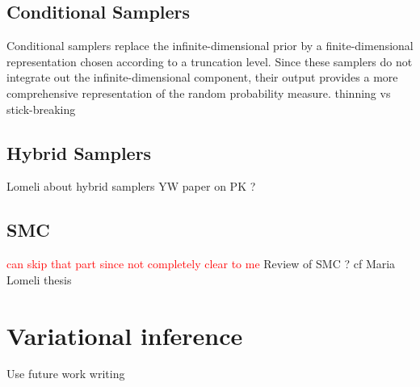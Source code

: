 \subsection{Conditional Samplers}
Conditional samplers replace the infinite-dimensional prior by a finite-dimensional representation chosen according to a truncation level. Since these samplers do not integrate out the infinite-dimensional component, their output provides a more comprehensive representation of the random probability measure.
thinning vs stick-breaking

\subsection{Hybrid Samplers}
Lomeli about hybrid samplers
YW paper on PK ?

\subsection{SMC}
\textcolor{red}{can skip that part since not completely clear to me}
Review of SMC ?
cf Maria Lomeli thesis


\section{Variational inference}
Use future work writing
